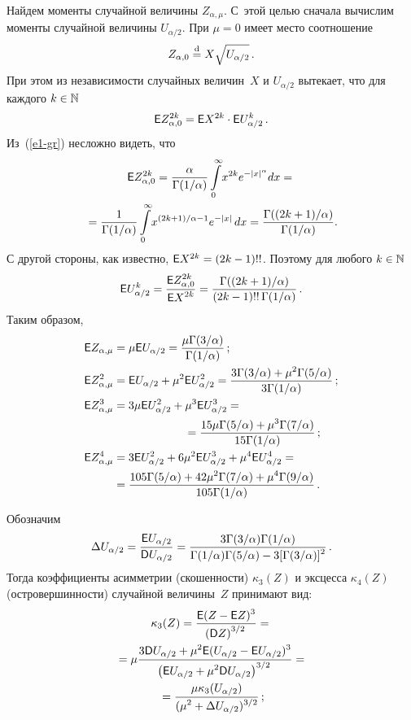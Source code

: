 \begin{multicols}{2}
Найдем моменты случайной величины $Z_{\alpha,\mu}$. С~этой целью
сначала вычислим моменты случайной величины $U_{\alpha/2}$. При
$\mu=0$ имеет место соотношение 
$$
Z_{\alpha,0}\stackrel{\mathrm{d}}{=}
X\sqrt{U_{\alpha/2}}\,.
$$
При этом из независимости случайных величин~$X$ 
и $U_{\alpha/2}$ вытекает, что для каждого $k\hm\in\mathbb{N}$
$$
{\sf E}Z_{\alpha,0}^{2k}={\sf E}X^{2k}\cdot{\sf E}U_{\alpha/2}^k\,.
$$
Из~(\ref{e1-gr}) несложно видеть, что
\begin{multline*}
{\sf E}Z_{\alpha,0}^{2k}=\displaystyle\frac{\displaystyle \alpha\mathstrut}{\displaystyle \Gamma({1}/{\alpha})\mathstrut}
\int\limits_{0}^{\infty}\!x^{2k}e^{-|x|^{\alpha}}dx={}\\
{}=\displaystyle\frac{\displaystyle 1\mathstrut}{\displaystyle \Gamma({1}/{\alpha})\mathstrut}\int\limits_{0}^{\infty}\!
x^{(2k+1)/\alpha-1}e^{-|x|}\,dx=\displaystyle\frac{\displaystyle \Gamma((2k+1)/\alpha)\mathstrut}{\displaystyle \Gamma({1}/{\alpha})\mathstrut}.
\end{multline*}
С другой стороны, как известно, ${\sf E}X^{2k}\hm=(2k-1)!!$. Поэтому
для любого $k\hm\in\mathbb{N}$
$$
{\sf E}U_{\alpha/2}^k=\displaystyle\frac{\displaystyle {\sf E}Z_{\alpha,0}^{2k}\mathstrut}{\displaystyle {\sf E}X^{2k}\mathstrut}=
\displaystyle\frac{\displaystyle \Gamma((2k+1)/\alpha)\mathstrut}{\displaystyle (2k-1)!!\,\Gamma({1}/{\alpha})\mathstrut}\,.
$$
Таким образом,
\begin{align*}
{\sf E}Z_{\alpha,\mu}&=\mu{\sf E}U_{\alpha/2}=
\fr{\mu\Gamma({3}/{\alpha})}{\Gamma({1}/{\alpha})}\,;\\
{\sf E}Z_{\alpha,\mu}^2&={\sf E}U_{\alpha/2}+\mu^2{\sf E}U_{\alpha/2}^2=
\fr{3\Gamma({3}/{\alpha})+\mu^2\Gamma({5}/{\alpha})}{3\Gamma({1}/{\alpha})}\,;
\\
{\sf E}Z_{\alpha,\mu}^3&=3\mu{\sf E}U_{\alpha/2}^2+\mu^3{\sf E}
U_{\alpha/2}^3={}\\
&{}\hspace*{22mm}=\fr{15\mu\Gamma({5}/{\alpha})+\mu^3\Gamma({7}/{\alpha})}
{15\Gamma({1}/{\alpha})}\,;
\\
{\sf E}Z_{\alpha,\mu}^4&=3{\sf E}U_{\alpha/2}^2+6\mu^2{\sf E}U_{\alpha/2}^3+
\mu^4{\sf E}U_{\alpha/2}^4={}\\
&{}=\fr{105\Gamma({5}/{\alpha})+42\mu^2\Gamma({7}/{\alpha})
+\mu^4\Gamma({9}/{\alpha})}{105\Gamma({1}/{\alpha})}\,.
\end{align*}

Обозначим
$$
\Delta U_{\alpha/2}=\displaystyle\frac{\displaystyle {\sf E}U_{\alpha/2}\mathstrut}{\displaystyle {\sf D}U_{\alpha/2}\mathstrut}=
\displaystyle\frac{\displaystyle 3\Gamma({3}/{\alpha})\Gamma({1}/{\alpha})\mathstrut}{\displaystyle \Gamma({1}/{\alpha})\Gamma({5}/{\alpha})-3[\Gamma({3}/{\alpha})]^2\mathstrut}\,.
$$
Тогда коэффициенты асимметрии (скошенности) $\kappa_3(Z)$ и эксцесса
$\kappa_4(Z)$ (ос\-тро\-вер\-шин\-нос\-ти) случайной величины~$Z$ принимают вид:
\begin{multline*}
\kappa_3(Z)=\displaystyle\frac{\displaystyle {\sf E}(Z-{\sf E}Z)^3\mathstrut}{\displaystyle \left({\sf D}Z\right)^{3/2}\mathstrut}={}\\
{}=\mu \displaystyle\frac{\displaystyle 3{\sf D}U_{\alpha/2}+\mu^2{\sf E}
(U_{\alpha/2}-{\sf E}U_{\alpha/2})^3\mathstrut}{\displaystyle \left({\sf E}
U_{\alpha/2}+\mu^2{\sf D}U_{\alpha/2}\right)^{3/2}\mathstrut}={}\\
{}=
\displaystyle\frac{\displaystyle \mu\kappa_3(U_{\alpha/2})\mathstrut}{\displaystyle (\mu^2+\Delta U_{\alpha/2})^{3/2}\mathstrut}\,;
\end{multline*}


\end{multicols}
